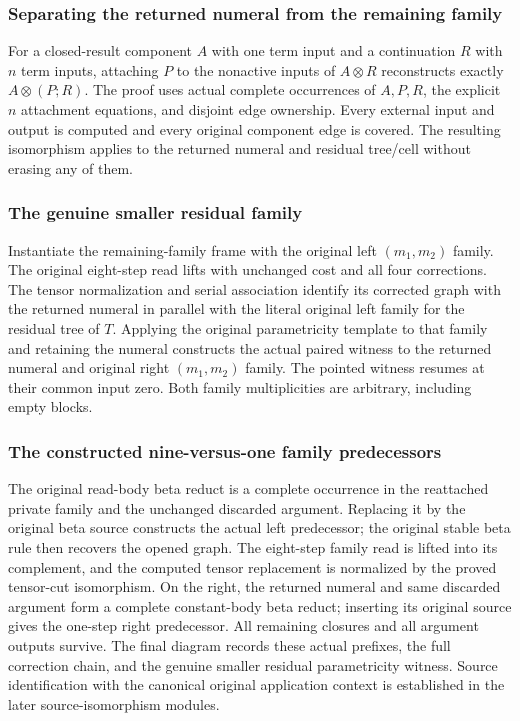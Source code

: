 \subsubsection{Separating the returned numeral from the remaining family}
For a closed-result component $A$ with one term input and a continuation $R$ with $n$ term inputs, attaching $P$ to the nonactive inputs of $A\otimes R$ reconstructs exactly $A\otimes(P;R)$.  The proof uses actual complete occurrences of $A,P,R$, the explicit $n$ attachment equations, and disjoint edge ownership.  Every external input and output is computed and every original component edge is covered.  The resulting isomorphism applies to the returned numeral and residual tree/cell without erasing any of them.

\subsubsection{The genuine smaller residual family}
Instantiate the remaining-family frame with the original left $(m_1,m_2)$ family.  The original eight-step read lifts with unchanged cost and all four corrections.  The tensor normalization and serial association identify its corrected graph with the returned numeral in parallel with the literal original left family for the residual tree of $T$.  Applying the original parametricity template to that family and retaining the numeral constructs the actual paired witness to the returned numeral and original right $(m_1,m_2)$ family.  The pointed witness resumes at their common input zero.  Both family multiplicities are arbitrary, including empty blocks.

\subsubsection{The constructed nine-versus-one family predecessors}
The original read-body beta reduct is a complete occurrence in the reattached private family and the unchanged discarded argument.  Replacing it by the original beta source constructs the actual left predecessor; the original stable beta rule then recovers the opened graph.  The eight-step family read is lifted into its complement, and the computed tensor replacement is normalized by the proved tensor-cut isomorphism.  On the right, the returned numeral and same discarded argument form a complete constant-body beta reduct; inserting its original source gives the one-step right predecessor.  All remaining closures and all argument outputs survive.  The final diagram records these actual prefixes, the full correction chain, and the genuine smaller residual parametricity witness.  Source identification with the canonical original application context is established in the later source-isomorphism modules.


